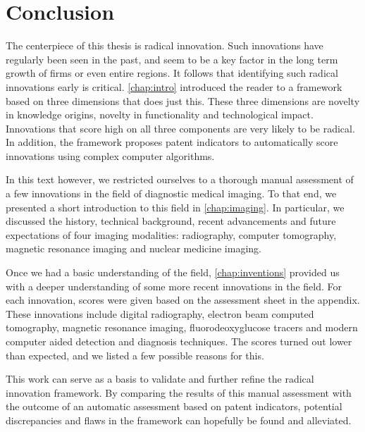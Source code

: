 \chapter{Conclusion}\label{chap:conclusions}
The centerpiece of this thesis is radical innovation. Such innovations have
regularly been seen in the past, and seem to be a key factor in the long term
growth of firms or even entire regions. It follows that identifying such radical
innovations early is critical. \autoref{chap:intro} introduced the reader to a
framework based on three dimensions that does just this. These three
dimensions are novelty in knowledge origins, novelty in functionality
and technological impact. Innovations that score high on all three components
are very likely to be radical. In addition, the framework proposes patent
indicators to automatically score innovations using complex computer algorithms.

In this text however, we restricted ourselves to a thorough manual assessment of
a few innovations in the field of diagnostic medical imaging. To that end, we
presented a short introduction to this field in \autoref{chap:imaging}. In
particular, we discussed the history, technical background, recent advancements
and future expectations of four imaging modalities: radiography, computer
tomography, magnetic resonance imaging and nuclear medicine imaging.

Once we had a basic understanding of the field, \autoref{chap:inventions}
provided us with a deeper understanding of some more recent innovations in the
field. For each innovation, scores were given based on the assessment sheet in
the appendix. These innovations include digital radiography, electron beam
computed tomography, magnetic resonance imaging, fluorodeoxyglucose tracers and
modern computer aided detection and diagnosis techniques. The scores turned out
lower than expected, and we listed a few possible reasons for this.

This work can serve as a basis to validate and further refine the radical
innovation framework. By comparing the results of this manual assessment with
the outcome of an automatic assessment based on patent indicators, potential
discrepancies and flaws in the framework can hopefully be found and alleviated.